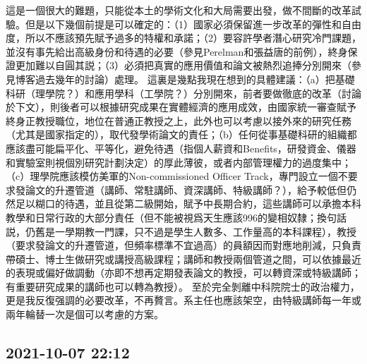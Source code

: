 \documentclass[twocolumn]{ctexart}
\begin{document}
這是一個很大的難題，只能從本土的學術文化和大局需要出發，做不間斷的改革試驗。但是以下幾個前提是可以確定的：（1）國家必須保留進一步改革的彈性和自由度，所以不應該預先賦予過多的特權和承諾；（2）要容許學者潛心研究冷門課題，並沒有事先給出高級身份和待遇的必要（參見Perelman和張益唐的前例），終身保證更加難以自圓其説；（3）必須把真實的應用價值和論文被熱烈追捧分別開來（參見博客過去幾年的討論）處理。
這裏是幾點我現在想到的具體建議：（a）把基礎科研（理學院？）和應用學科（工學院？）分別開來，前者要做徹底的改革（討論於下文），則後者可以根據研究成果在實體經濟的應用成效，由國家統一審查賦予終身正教授職位，地位在普通正教授之上，此外也可以考慮以接外來的研究任務（尤其是國家指定的），取代發學術論文的責任；（b）任何從事基礎科研的組織都應該盡可能扁平化、平等化，避免待遇（指個人薪資和Benefits，研發資金、儀器和實驗室則視個別研究計劃決定）的厚此薄彼，或者内部管理權力的過度集中；（c）理學院應該模仿美軍的Non-commissioned Officer Track，專門設立一個不要求發論文的升遷管道（講師、常駐講師、資深講師、特級講師？），給予較低但仍然足以糊口的待遇，並且從第二級開始，賦予中長期合約，這些講師可以承擔本科教學和日常行政的大部分責任（但不能被視爲天生應該996的變相奴隸；換句話説，仍舊是一學期教一門課，只不過是學生人數多、工作量高的本科課程），教授（要求發論文的升遷管道，但頻率標準不宜過高）的員額因而對應地削減，只負責帶碩士、博士生做研究或講授高級課程；講師和教授兩個管道之間，可以依據最近的表現或偏好做調動（亦即不想再定期發表論文的教授，可以轉資深或特級講師；有重要研究成果的講師也可以轉為教授）。
至於完全剝離中科院院士的政治權力，更是我反復强調的必要改革，不再贅言。系主任也應該架空，由特級講師每一年或兩年輪替一次是個可以考慮的方案。
\subsection*{2021-10-07 22:12}
\end{document}
